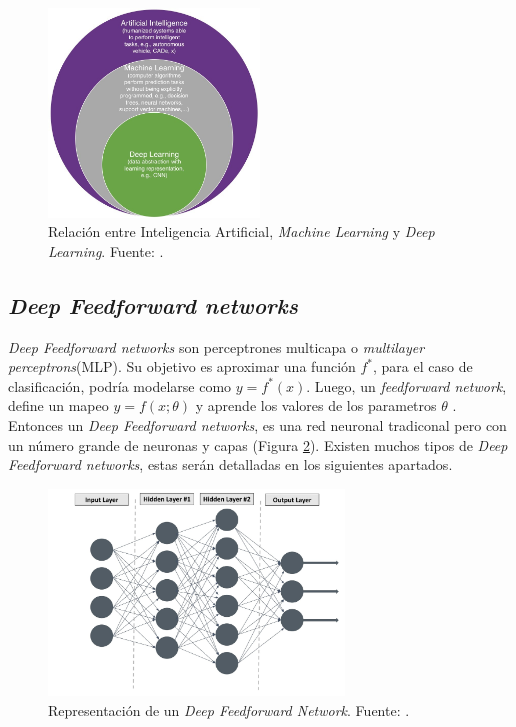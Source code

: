 \begin{figure}[H]
	\centering
	\includegraphics[width=0.5\textwidth]{img/neoantigen/dl}
	\caption{Relación entre Inteligencia Artificial, \textit{Machine Learning} y \textit{Deep Learning}. Fuente: \cite{el2022machine}.}
	\label{fig:dl}
\end{figure}


\subsection{\textit{Deep Feedforward networks}}

\textit{Deep Feedforward networks} son perceptrones multicapa o \textit{multilayer perceptrons}(MLP). Su objetivo es aproximar una función $f^*$, para el caso de clasificación, podría modelarse como $ y=f^*(x)$. Luego, un \textit{feedforward network}, define un mapeo $y = f(x;\theta)$ y aprende los valores de los parametros $\theta$ \cite{Goodfellow2016}. Entonces un \textit{Deep Feedforward networks}, es una red neuronal tradiconal pero con un número grande de neuronas y capas (Figura \ref{fig:dnn}). Existen muchos tipos de \textit{Deep Feedforward networks}, estas serán detalladas en los siguientes apartados.

\begin{figure}[H]
	\centering
	\includegraphics[width=0.7\textwidth]{img/neoantigen/deep_nn}
	\caption{Representación de un \textit{Deep Feedforward Network}. Fuente: \cite{el2022machine}.}
	\label{fig:dnn}
\end{figure}


